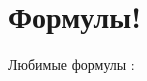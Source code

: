 \documentclass[12pt, a4paper]{article}
\begin{document}
\begin{figure}[h]
\end{figure}

\section{Формулы!}

Любимые формулы \Heart : 
\end{document}
